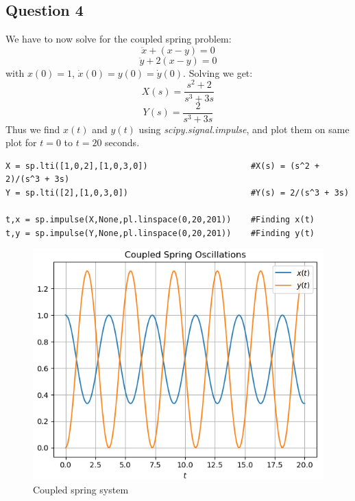 \documentclass[11pt, a4paper]{article}
\begin{document}
\subsection{Question 4}
    We have to now solve for the coupled spring problem:
    \begin{equation*}
        \ddot x + (x - y) = 0
    \end{equation*}
    \begin{equation*}
        \ddot y + 2(x - y) = 0
    \end{equation*}
    with $x(0) = 1$, $\dot x(0) = y(0) = \dot y(0)$. Solving we get:
    \begin{equation}
        X(s) = \frac{s^2 + 2}{s^3 + 3s}
    \end{equation}
    \begin{equation}
        Y(s) = \frac{2}{s^3 + 3s}
    \end{equation}
    Thus we find $x(t)$ and $y(t)$ using \textit{scipy.signal.impulse}, and plot them on same plot for $t = 0$ to $t = 20$ seconds.
    \begin{verbatim}
X = sp.lti([1,0,2],[1,0,3,0])                     #X(s) = (s^2 + 2)/(s^3 + 3s)
Y = sp.lti([2],[1,0,3,0])                         #Y(s) = 2/(s^3 + 3s)

t,x = sp.impulse(X,None,pl.linspace(0,20,201))    #Finding x(t)
t,y = sp.impulse(Y,None,pl.linspace(0,20,201))    #Finding y(t)
    \end{verbatim}
    \begin{figure}[!h]
        \centering
        \includegraphics[scale = 0.8]{Figure 4.png}
        \caption{Coupled spring system}
        \label{fig:Figure 4}
    \end{figure}
    
\end{document}
